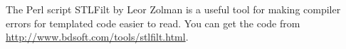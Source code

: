 The Perl script STLFilt by Leor Zolman is a useful tool for making compiler errors for templated code easier to read.  You
can get the code from \url{http://www.bdsoft.com/tools/stlfilt.html}.
